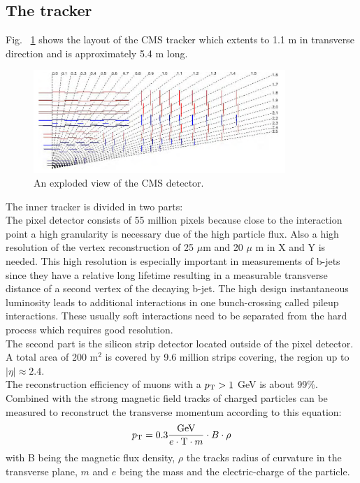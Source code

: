 \subsection{The tracker}
\label{sec:tracker}
Fig. ~\ref{fig:tracker} shows the layout of the CMS tracker\cite{Chatrchyan:2008zzk}\cite{bib:cmsptdr1}\cite{bib:cmstdr:tracker} which extents to 1.1 m in transverse direction and is approximately 5.4 m long.\\
\begin{figure}[tbhn]
\begin{center}
\includegraphics[width=0.85\textwidth]{detector/figures/tracker.png}
\end{center}
\caption{An exploded view of the CMS detector.}
\label{fig:tracker}
\end{figure}
The inner tracker is divided in two parts:\\
The pixel detector consists of 55 million pixels because close to the interaction point a high granularity is necessary due of the high particle flux. Also a high resolution of the vertex reconstruction of 25 $\mu$m and 20 $\mu$ m in X and Y is needed\cite{CMS-PAS-TRK-10-005}. This high resolution is especially important in measurements of b-jets since they have a relative long lifetime resulting in a measurable transverse distance of a second vertex of the decaying b-jet. The high design instantaneous luminosity leads to additional interactions in one bunch-crossing called pileup interactions. These usually soft interactions need to be separated from the hard process which requires good resolution.\\
The second part is the silicon strip detector located outside of the pixel detector. A total area of 200 $\text{m}^2$ is covered by 9.6 million strips covering, the region up to $|\eta| \approx 2.4$.\\
The reconstruction efficiency of muons with a $p_{\text{T}} > 1$ GeV is about 99\%.
Combined with the strong magnetic field tracks of charged particles can be measured to reconstruct the transverse momentum according to this equation:
$$ p_{\text{T}} = 0.3\frac{\text{GeV}}{e \cdot \text{T} \cdot m} \cdot B \cdot \rho$$
with B being the magnetic flux density, $\rho$ the tracks radius of curvature in the transverse plane, $m$ and $e$ being the mass and the electric-charge of the particle.



